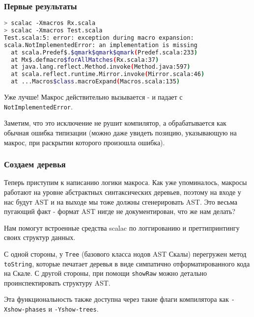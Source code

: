 \documentclass[hyperref={bookmarks=false}]{beamer}
\begin{document}
\begin{frame}[t,fragile]
\frametitle{Первые результаты}

\begin{lstlisting}[language=bash]
> scalac -Xmacros Rx.scala
> scalac -Xmacros Test.scala
Test.scala:5: error: exception during macro expansion:
scala.NotImplementedError: an implementation is missing
  at scala.Predef$.$qmark$qmark$qmark(Predef.scala:233)
  at Mx$.defmacro$forAllMatches(Rx.scala:37)
  at java.lang.reflect.Method.invoke(Method.java:597)
  at scala.reflect.runtime.Mirror.invoke(Mirror.scala:46)
  at ...Macros$class.macroExpand(Macros.scala:135)
\end{lstlisting}

Уже лучше! Макрос действительно вызывается - и падает с \texttt{NotImplementedError}.

Заметим, что это исключение не рушит компилятор, а обрабатывается как обычная ошибка типизации (можно даже увидеть позицию, указывающую на макрос, при раскрытии которого произошла ошибка).
\end{frame}

\begin{frame}[t,fragile]
\frametitle{Создаем деревья}
Теперь приступим к написанию логики макроса. Как уже упоминалось, макросы работают на уровне абстрактных синтаксических деревьев, поэтому на входе у нас будут AST и на выходе мы тоже должны сгенерировать AST. Это весьма пугающий факт - формат AST нигде не документирован, что же нам делать?

Нам помогут встроенные средства scalac по логгированию и преттипринтингу своих структур данных.

С одной стороны, у \texttt{Tree} (базового класса нодов AST Скалы) перегружен метод \texttt{toString}, которые печатает деревья в виде симпатично отформатированного кода на Скале. С другой стороны, при помощи \texttt{showRaw} можно детально проинспектировать структуру AST.

Эта функциональность также доступна через такие флаги компилятора как \texttt{-Xshow-phases} и \texttt{-Yshow-trees}.
\end{frame}
\end{document}
